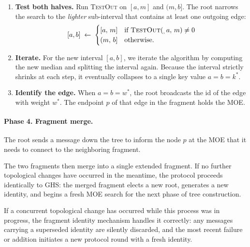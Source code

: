 \begin{enumerate}
        Thus, for a sufficiently large constant $k$, the chosen split point $m$ shrinks
        the search space by a constant fraction with high constant probability. Over the
        course of the algorithm, this makes the interval shrink to a single edge in
        $\mathcal{O}(\log N)$ expected rounds.

    \item \textbf{Test both halves.}
          Run \textsc{TestOut} on $[a,m]$ and $(m,b]$. The root narrows the search to
          the \emph{lighter} sub-interval that contains at least one outgoing edge:
          \[
              [a,b] \;\gets\;
              \begin{cases}
                  [a,\,m]     & \text{if } \textsc{TestOut} (_,\,a,\,m) \neq 0 \\
                  (m,\,b] & \text{otherwise.}
              \end{cases}
          \]
 
    \item \textbf{Iterate.}
          For the new interval $[a,b]$, we iterate the algorithm by computing the new median and splitting the interval again. Because the interval strictly shrinks at each step, it eventually collapses to a single key value $a = b = k^*$.

    \item \textbf{Identify the edge.}
          When $a = b = w^*$, the root broadcasts the id of the edge with weight $w^*$.
          The endpoint $p$ of that edge in the fragment holds the MOE.

\end{enumerate}

\paragraph{Phase 4. Fragment merge.}

The root sends a message down the tree to inform the node $p$ at the MOE that it needs to
connect to the neighboring fragment.

The two fragments then merge into a single extended fragment. If no further topological
changes have occurred in the meantime, the protocol proceeds identically to GHS: the
merged fragment elects a new root, generates a new identity, and begins a fresh MOE search
for the next phase of tree construction.

If a concurrent topological change has occurred while this process was in progress, the
fragment identity mechanism handles it correctly: any messages carrying a superseded
identity are silently discarded, and the most recent failure or addition initiates a new
protocol round with a fresh identity.

